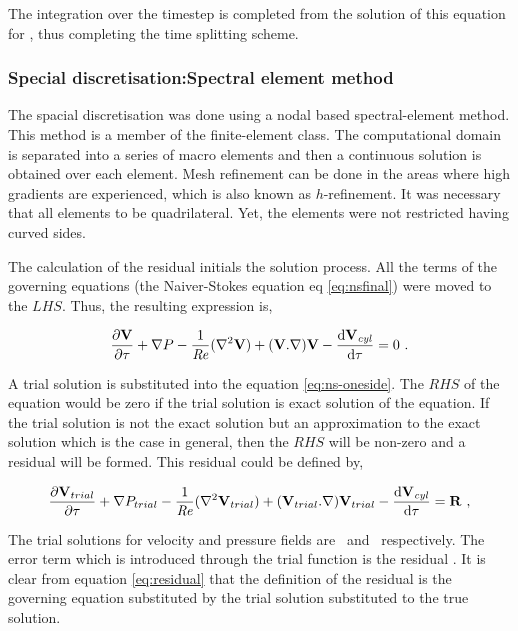 The integration over the timestep is completed from the solution of this equation  for \Vnext, thus completing the time splitting scheme. 


\subsubsection{Special discretisation:Spectral element method}
 
 The spacial discretisation was done using a nodal based spectral-element method. This method is a member of the finite-element class. The computational domain is separated into a series of macro elements and then a continuous solution is obtained over each element. Mesh refinement can be done in the areas where high gradients are experienced, which is also known as $h$-refinement. It was necessary that all elements to be quadrilateral. Yet, the elements were not restricted having curved sides.
 
 The calculation of the residual \residual initials the solution process. All the terms of the governing equations (the Naiver-Stokes equation eq \ref{eq:nsfinal}) were moved to the $LHS$. Thus, the resulting expression is, 
 
 \begin{equation} \centering
 \label{eq:ns-oneside}
 \pderiv{\vecV}{\tau} + \grad{\Pres} - \frac{1}{\Rey}(\gradsq{\vecV}) + (\vecV.\nabla)\vecV - \accframe = 0 ~.
 \end{equation}
 
 A trial solution is substituted into the equation \ref{eq:ns-oneside}. The $RHS$ of the equation would be zero if the trial solution is exact solution of the equation. If the trial solution is not the exact solution but an approximation to the exact solution which is the case in general, then the $RHS$ will be non-zero and a residual will be formed. This residual could be defined by, 
 
 \begin{equation} \centering
 \label{eq:residual}
 \pderiv{\Vtrial}{\tau} +\grad{\Ptrial} - \frac{1}{\Rey}(\gradsq{\Vtrial}) + (\Vtrial.\nabla)\Vtrial - \accframe = \residual ~,
 \end{equation}
 
 The trial solutions for velocity and pressure fields are \Vtrial\ and \Ptrial\ respectively. The error term which is introduced through the trial function is the residual \residual. It is clear from equation \ref{eq:residual} that the definition of the residual is the governing equation substituted by the trial solution substituted to the true solution.
 
